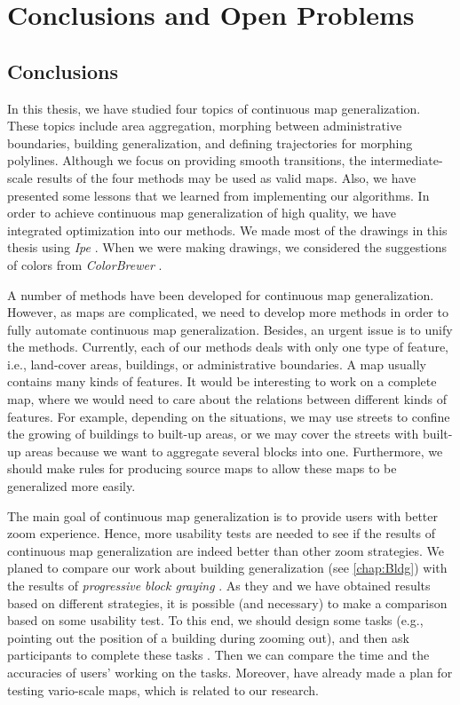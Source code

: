 \chapter{Conclusions and Open Problems}
\label{chap:Conclusion}

\section{Conclusions}

In this thesis, we have studied four topics of 
continuous map generalization.
These topics include area aggregation, 
morphing between administrative boundaries,
building generalization, and
defining trajectories for morphing polylines.
Although we focus on providing smooth transitions,
the intermediate-scale results of the four methods
may be used as valid maps.
Also, we have presented some lessons that 
we learned from implementing our algorithms.
In order to achieve continuous map generalization 
of high quality, 
we have integrated optimization into our methods.
%
We made most of the drawings in this thesis
using \emph{Ipe} \parencite[see][]{Schwarzkopf1995Ipe}.
When we were making drawings,
we considered the suggestions of colors 
from \emph{ColorBrewer} 
\parencite[see][]{Harrower2003ColorBrewer,Brewer2003Print}.

A number of methods have been developed for
continuous map generalization.
However, as maps are complicated,
we need to develop more methods 
in order to fully automate continuous map generalization.
Besides, an urgent issue is to unify the methods.
Currently, each of our methods deals with 
only one type of feature, i.e., 
land-cover areas, buildings, or administrative boundaries.
A map usually contains many kinds of features.
It would be interesting to work on a complete map,
where we would need to care about the relations 
between different kinds of features.
For example, depending on the situations, 
we may use streets to confine the growing of 
buildings to built-up areas, 
or we may cover the streets with built-up areas 
because we want to aggregate several blocks into one.
Furthermore, we should make rules for producing source maps
to allow these maps to be generalized more easily.

The main goal of continuous map generalization is to provide 
users with better zoom experience.
Hence, more usability tests are needed to see 
if the results of continuous map generalization 
are indeed better than other zoom strategies.
We planed to compare our work about building generalization 
(see \chap\ref{chap:Bldg}) 
with the results of \emph{progressive block graying} 
\parencite[see][]{Touya2017Progressive}.
As they and we have obtained results 
based on different strategies, 
it is possible (and necessary) to make a comparison 
based on some usability test.
To this end, we should design some tasks 
(e.g., pointing out the 
position of a building during zooming out), 
and then ask participants to complete these tasks
\parencite[e.g.,][]{Midtbo2007}.
Then we can compare the time and the accuracies
of users' working on the tasks.
Moreover, \textcite{Suba2016Usability} 
have already made a plan for 
testing vario-scale maps, which is related to our research.


